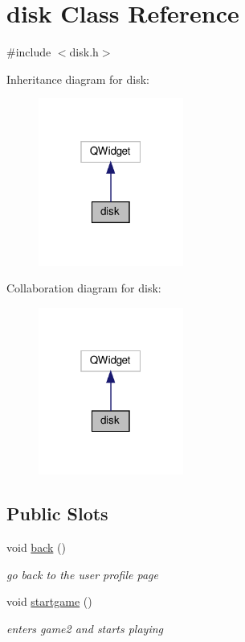 \hypertarget{classdisk}{}\section{disk Class Reference}
\label{classdisk}


{\ttfamily \#include $<$disk.\+h$>$}



Inheritance diagram for disk\+:
\nopagebreak
\begin{figure}[H]
\begin{center}
\leavevmode
\includegraphics[width=135pt]{classdisk__inherit__graph}
\end{center}
\end{figure}


Collaboration diagram for disk\+:
\nopagebreak
\begin{figure}[H]
\begin{center}
\leavevmode
\includegraphics[width=135pt]{classdisk__coll__graph}
\end{center}
\end{figure}
\subsection*{Public Slots}
\begin{DoxyCompactItemize}
\item 
void \hyperlink{classdisk_a9bff15b70a60d9264183141046d172ed}{back} ()
\begin{DoxyCompactList}\small\item\em go back to the user profile page \end{DoxyCompactList}\item 
void \hyperlink{classdisk_a5b39c1a38b5a5c337c6b60470b9ef748}{startgame} ()
\begin{DoxyCompactList}\small\item\em enters game2 and starts playing \end{DoxyCompactList}\end{DoxyCompactItemize}
